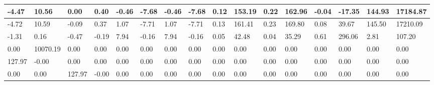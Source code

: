 \begin{tabular}{|l|l|l|l|l|l|l|l|l|l|l|l|l|l|l|l|}
\hline
-4.47&10.56&0.00&0.40&-0.46&-7.68&-0.46&-7.68&0.12&153.19&0.22&162.96&-0.04&-17.35&144.93&17184.87\\\hline
-4.72&10.59&-0.09&0.37&1.07&-7.71&1.07&-7.71&0.13&161.41&0.23&169.80&0.08&39.67&145.50&17210.09\\\hline
-1.31&0.16&-0.47&-0.19&7.94&-0.16&7.94&-0.16&0.05&42.48&0.04&35.29&0.61&296.06&2.81&107.20\\\hline
0.00&10070.19&0.00&0.00&0.00&0.00&0.00&0.00&0.00&0.00&0.00&0.00&0.00&0.00&0.00&0.00\\\hline
127.97&-0.00&0.00&0.00&0.00&0.00&0.00&0.00&0.00&0.00&0.00&0.00&0.00&0.00&0.00&0.00\\\hline
0.00&0.00&127.97&-0.00&0.00&0.00&0.00&0.00&0.00&0.00&0.00&0.00&0.00&0.00&0.00&0.00\\\hline
\end{tabular}
